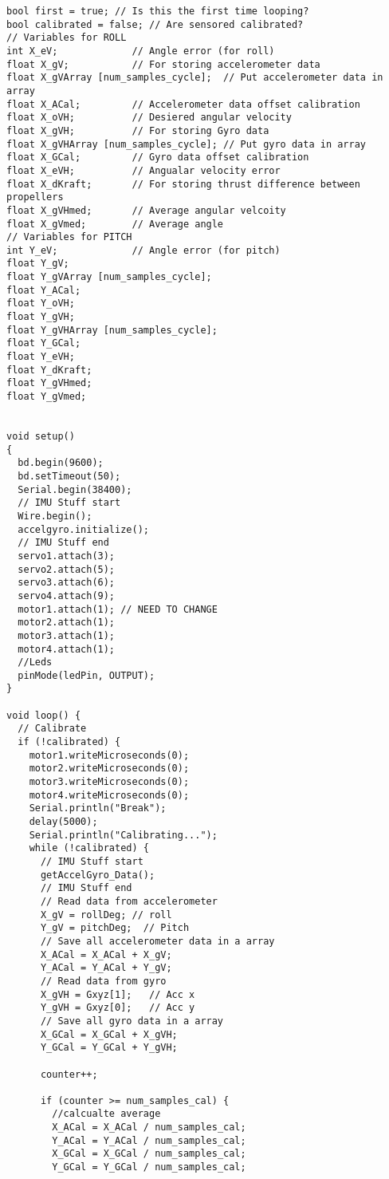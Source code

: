 \begin{lstlisting}
bool first = true; // Is this the first time looping?
bool calibrated = false; // Are sensored calibrated?
// Variables for ROLL
int X_eV;             // Angle error (for roll)
float X_gV;           // For storing accelerometer data
float X_gVArray [num_samples_cycle];  // Put accelerometer data in array
float X_ACal;         // Accelerometer data offset calibration
float X_oVH;          // Desiered angular velocity
float X_gVH;          // For storing Gyro data
float X_gVHArray [num_samples_cycle]; // Put gyro data in array
float X_GCal;         // Gyro data offset calibration
float X_eVH;          // Angualar velocity error
float X_dKraft;       // For storing thrust difference between propellers
float X_gVHmed;       // Average angular velcoity
float X_gVmed;        // Average angle
// Variables for PITCH
int Y_eV;             // Angle error (for pitch)
float Y_gV;
float Y_gVArray [num_samples_cycle];
float Y_ACal;
float Y_oVH;
float Y_gVH;
float Y_gVHArray [num_samples_cycle];
float Y_GCal;
float Y_eVH;
float Y_dKraft;
float Y_gVHmed;
float Y_gVmed;
 
 
void setup()
{
  bd.begin(9600);
  bd.setTimeout(50);
  Serial.begin(38400);
  // IMU Stuff start
  Wire.begin();
  accelgyro.initialize();
  // IMU Stuff end
  servo1.attach(3);
  servo2.attach(5);
  servo3.attach(6);
  servo4.attach(9);
  motor1.attach(1); // NEED TO CHANGE
  motor2.attach(1); 
  motor3.attach(1);  
  motor4.attach(1); 
  //Leds
  pinMode(ledPin, OUTPUT);
}
 
void loop() {
  // Calibrate
  if (!calibrated) {
    motor1.writeMicroseconds(0);
    motor2.writeMicroseconds(0);
    motor3.writeMicroseconds(0);
    motor4.writeMicroseconds(0);
    Serial.println("Break");
    delay(5000);
    Serial.println("Calibrating...");
    while (!calibrated) {
      // IMU Stuff start
      getAccelGyro_Data();
      // IMU Stuff end
      // Read data from accelerometer
      X_gV = rollDeg; // roll
      Y_gV = pitchDeg;  // Pitch
      // Save all accelerometer data in a array
      X_ACal = X_ACal + X_gV;
      Y_ACal = Y_ACal + Y_gV;
      // Read data from gyro
      X_gVH = Gxyz[1];   // Acc x
      Y_gVH = Gxyz[0];   // Acc y
      // Save all gyro data in a array
      X_GCal = X_GCal + X_gVH;
      Y_GCal = Y_GCal + Y_gVH;
 
      counter++;
 
      if (counter >= num_samples_cal) {
        //calcualte average
        X_ACal = X_ACal / num_samples_cal;
        Y_ACal = Y_ACal / num_samples_cal;
        X_GCal = X_GCal / num_samples_cal;
        Y_GCal = Y_GCal / num_samples_cal;
 

\end{lstlisting}
